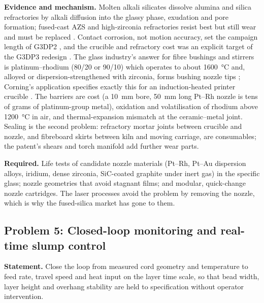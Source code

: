 \textbf{Evidence and mechanism.} Molten alkali silicates dissolve alumina and silica refractories by alkali diffusion into the glassy phase, exudation and pore formation; fused-cast AZS and high-zirconia refractories resist best but still wear and must be replaced \citep{zircorr2025}. Contact corrosion, not motion accuracy, set the campaign length of G3DP2 \citep{inamura2018}, and the crucible and refractory cost was an explicit target of the G3DP3 redesign \citep{mit2024masonry}. The glass industry's answer for fibre bushings and stirrers is platinum--rhodium (80/20 or 90/10) which operates to about \SI{1600}{\celsius} and, alloyed or dispersion-strengthened with zirconia, forms bushing nozzle tips \citep{pgm2010}; Corning's application specifies exactly this for an induction-heated printer crucible \citep{patent_corning2021}. The barriers are cost (a \SI{10}{mm} bore, \SI{50}{mm} long Pt--Rh nozzle is tens of grams of platinum-group metal), oxidation and volatilisation of rhodium above \SI{1200}{\celsius} in air, and thermal-expansion mismatch at the ceramic--metal joint. Sealing is the second problem: refractory mortar joints between crucible and nozzle, and fibreboard skirts between kiln and moving carriage, are consumables; the patent's shears and torch manifold add further wear parts.

\textbf{Required.} Life tests of candidate nozzle materials (Pt--Rh, Pt--Au dispersion alloys, iridium, dense zirconia, SiC-coated graphite under inert gas) in the specific glass; nozzle geometries that avoid stagnant films; and modular, quick-change nozzle cartridges. The laser processes avoid the problem by removing the nozzle, which is why the fused-silica market has gone to them.

\subsection{Problem 5: Closed-loop monitoring and real-time slump control}
\textbf{Statement.} Close the loop from measured cord geometry and temperature to feed rate, travel speed and heat input on the layer time scale, so that bead width, layer height and overhang stability are held to specification without operator intervention.

